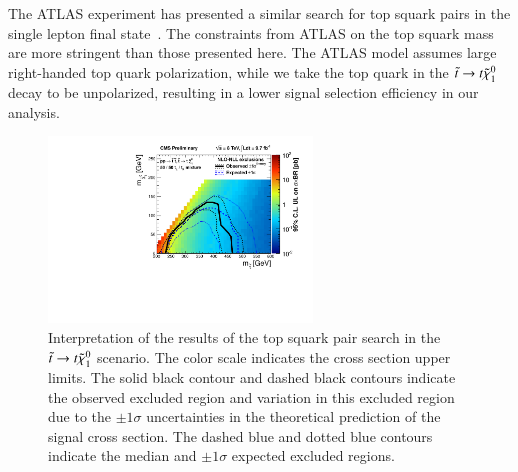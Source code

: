 The ATLAS experiment has presented a similar search for top squark pairs in the single lepton final state~\cite{ref:atlasstop}.
The constraints from ATLAS on the top squark mass are more stringent than those presented here. The ATLAS model assumes large 
right-handed top quark polarization, while we take the top quark in the $\tilde{t}\to t\tilde{\chi}_{1}^{0}$ decay to be unpolarized, 
resulting in a lower signal selection efficiency in our analysis.

\begin{figure}
\centering
\includegraphics[width=7cm,clip]{HCPPlots/stop_interpretation.pdf}
\caption{Interpretation of the results of the top squark pair search in the $\tilde{t}\to t\tilde{\chi}_{1}^{0}$ scenario. The color scale indicates the
cross section upper limits. The solid black contour and dashed black contours indicate the observed excluded region and variation in this
excluded region due to the $\pm1\sigma$ uncertainties in the theoretical prediction of the signal cross section. The dashed blue
and dotted blue contours indicate the median and $\pm1\sigma$ expected excluded regions. }
\label{fig:stop_interpretation}       %
\end{figure}
